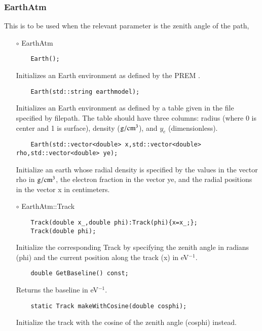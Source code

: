 \subsubsection{{EarthAtm}}
This is to be used when the relevant parameter is the zenith angle of
the path,
\begin{itemize}
\item[$\circ$] {\ttf EarthAtm}
  \begin{lstlisting}
    Earth();
  \end{lstlisting}
  Initializes an {\ttf Earth} environment as defined by the PREM \citep{dziewonski1981preliminary}.
  \begin{lstlisting}
    Earth(std::string earthmodel);
  \end{lstlisting}
  Initializes an {\ttf Earth} environment as defined by a table given in the file specified by {\ttf filepath}. The table should have three columns: radius (where 0 is center and 1 is surface), density (${\rm g}/{\rm cm}^3$), and $y_e$ (dimensionless). 
  \begin{lstlisting}
    Earth(std::vector<double> x,std::vector<double> rho,std::vector<double> ye);
  \end{lstlisting}
  Initialize an {\ttf earth} whose radial density is specified by the
  values in the vector {\ttf rho} in ${\rm g}/{\rm cm}^3$, the
  electron fraction in the vector {\ttf ye}, and the radial positions
  in the vector {\ttf x} in centimeters. 

\item[$\circ$] {\ttf EarthAtm::Track}
  \begin{lstlisting}
    Track(double x_,double phi):Track(phi){x=x_;};
    Track(double phi);
  \end{lstlisting}
  Initialize the corresponding {\ttf Track} by specifying the zenith
  angle in radians ({\ttf phi}) and the current position along the
  track ({\ttf x}) in eV$^{-1}$.
  
  \begin{lstlisting}
    double GetBaseline() const;
  \end{lstlisting}
  Returns the baseline in eV$^{-1}$.

  \begin{lstlisting}
    static Track makeWithCosine(double cosphi);
  \end{lstlisting}
  Initialize the track with the cosine of the zenith angle ({\ttf cosphi}) instead. 
  
\end{itemize}

